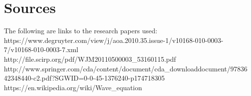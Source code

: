 \documentclass{article}
\begin{document}
\section{Sources}
The following are links to the research papers used:
https://www.degruyter.com/view/j/aoa.2010.35.issue-1/v10168-010-0003-7/v10168-010-0003-7.xml\\
http://file.scirp.org/pdf/WJM20110500003_53160115.pdf\\
http://www.springer.com/cda/content/document/cda_downloaddocument/9783642348440-c2.pdf?SGWID=0-0-45-1376240-p174718305\\
https://en.wikipedia.org/wiki/Wave_equation
\end{document}
